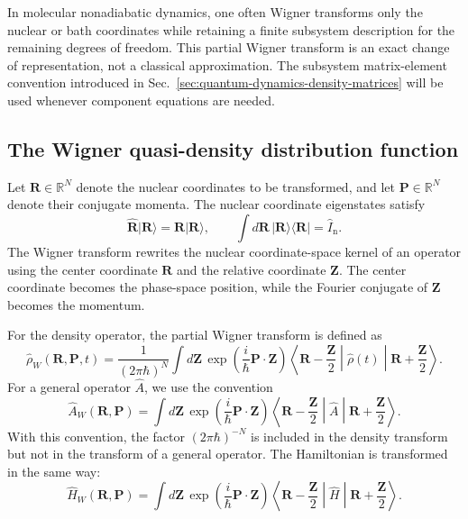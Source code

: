 \documentclass[
  11pt,
  letterpaper,
  onehalfspacing,
  normalmargins,
  equalmargins,
  oneside
]{ut-thesis}
\begin{document}
In molecular nonadiabatic dynamics, one often Wigner transforms only the
nuclear or bath coordinates while retaining a finite subsystem description for
the remaining degrees of freedom. This partial Wigner transform is an exact
change of representation, not a classical approximation. The subsystem
matrix-element convention introduced in
Sec.~\ref{sec:quantum-dynamics-density-matrices} will be used whenever
component equations are needed.

\subsection{The Wigner quasi-density distribution function}
\label{subsec:wigner-quasi-density}

Let \(\mathbf R\in\mathbb R^N\) denote the nuclear coordinates to be
transformed, and let \(\mathbf P\in\mathbb R^N\) denote their conjugate
momenta. The nuclear coordinate eigenstates satisfy
\begin{equation}
\hat{\mathbf R}|\mathbf R\rangle
=
\mathbf R|\mathbf R\rangle,
\qquad
\int d\mathbf R\,
|\mathbf R\rangle\langle \mathbf R|
=
\hat I_{\mathrm n}.
\label{eq:coordinate-resolution-identity}
\end{equation}
The Wigner transform rewrites the nuclear coordinate-space kernel of an
operator using the center coordinate \(\mathbf R\) and the relative coordinate
\(\mathbf Z\). The center coordinate becomes the phase-space position, while
the Fourier conjugate of \(\mathbf Z\) becomes the momentum.

For the density operator, the partial Wigner transform is defined as
\begin{equation}
\hat\rho_W(\mathbf R,\mathbf P,t)
=
\frac{1}{(2\pi\hbar)^N}
\int d\mathbf Z\,
\exp\left(\frac{i}{\hbar}\mathbf P\cdot\mathbf Z\right)
\left\langle
\mathbf R-\frac{\mathbf Z}{2}
\middle|
\hat\rho(t)
\middle|
\mathbf R+\frac{\mathbf Z}{2}
\right\rangle .
\label{eq:wigner-density-definition}
\end{equation}
For a general operator \(\hat A\), we use the convention
\begin{equation}
\hat A_W(\mathbf R,\mathbf P)
=
\int d\mathbf Z\,
\exp\left(\frac{i}{\hbar}\mathbf P\cdot\mathbf Z\right)
\left\langle
\mathbf R-\frac{\mathbf Z}{2}
\middle|
\hat A
\middle|
\mathbf R+\frac{\mathbf Z}{2}
\right\rangle .
\label{eq:wigner-transform-operator}
\end{equation}
With this convention, the factor \((2\pi\hbar)^{-N}\) is included in the
density transform but not in the transform of a general operator. The
Hamiltonian is transformed in the same way:
\begin{equation}
\hat H_W(\mathbf R,\mathbf P)
=
\int d\mathbf Z\,
\exp\left(\frac{i}{\hbar}\mathbf P\cdot\mathbf Z\right)
\left\langle
\mathbf R-\frac{\mathbf Z}{2}
\middle|
\hat H
\middle|
\mathbf R+\frac{\mathbf Z}{2}
\right\rangle .
\label{eq:wigner-transform-hamiltonian}
\end{equation}
\end{document}
